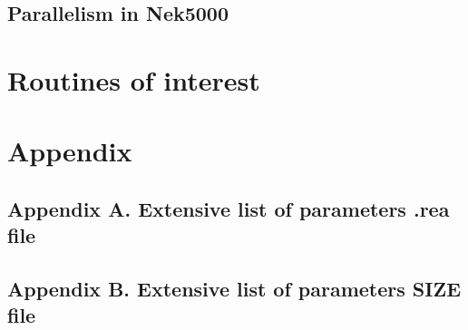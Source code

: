 \documentclass[11pt]{report}              %
\begin{document}
\section{Parallelism in Nek5000}


\chapter{Routines of interest}


%
\begin{comment}
\chapter{Postprocessing}
\section{Visualisation}

\end{comment} 
\chapter{Appendix}
\section{Appendix A. Extensive list of parameters .rea file}

\section{Appendix B. Extensive list of parameters SIZE file}

%


\renewcommand\refname{References}


\addtolength{\baselineskip}{-.1\baselineskip}

\addtolength{\baselineskip}{+.111111\baselineskip}
\end{document}
